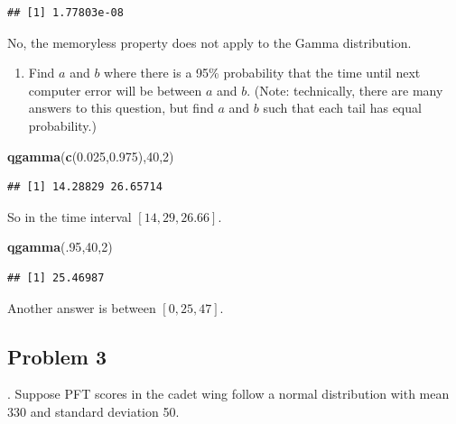 \documentclass[
]{book}
\newenvironment{Shaded}{\begin{snugshade}}{\end{snugshade}}
\newcommand{\DecValTok}[1]{\textcolor[rgb]{0.00,0.00,0.81}{#1}}
\newcommand{\FloatTok}[1]{\textcolor[rgb]{0.00,0.00,0.81}{#1}}
\newcommand{\KeywordTok}[1]{\textcolor[rgb]{0.13,0.29,0.53}{\textbf{#1}}}
\newcommand{\NormalTok}[1]{#1}
\providecommand{\tightlist}{%
  \setlength{\itemsep}{0pt}\setlength{\parskip}{0pt}}
\begin{document}
\begin{verbatim}
## [1] 1.77803e-08
\end{verbatim}

No, the memoryless property does not apply to the Gamma distribution.

\begin{enumerate}
\def\labelenumi{\alph{enumi}.}
\setcounter{enumi}{2}
\tightlist
\item
  Find \(a\) and \(b\) where there is a 95\% probability that the time until next computer error will be between \(a\) and \(b\). (Note: technically, there are many answers to this question, but find \(a\) and \(b\) such that each tail has equal probability.)
\end{enumerate}

\begin{Shaded}
\begin{Highlighting}[]
\KeywordTok{qgamma}\NormalTok{(}\KeywordTok{c}\NormalTok{(}\FloatTok{0.025}\NormalTok{,}\FloatTok{0.975}\NormalTok{),}\DecValTok{40}\NormalTok{,}\DecValTok{2}\NormalTok{)}
\end{Highlighting}
\end{Shaded}

\begin{verbatim}
## [1] 14.28829 26.65714
\end{verbatim}

So in the time interval \([14,29,26.66]\).

\begin{Shaded}
\begin{Highlighting}[]
\KeywordTok{qgamma}\NormalTok{(.}\DecValTok{95}\NormalTok{,}\DecValTok{40}\NormalTok{,}\DecValTok{2}\NormalTok{)}
\end{Highlighting}
\end{Shaded}

\begin{verbatim}
## [1] 25.46987
\end{verbatim}

Another answer is between \([0,25,47]\).

\newpage

\hypertarget{problem-3-8}{%
\subsection{Problem 3}\label{problem-3-8}}

. Suppose PFT scores in the cadet wing follow a normal distribution with mean 330 and standard deviation 50.
\end{document}
